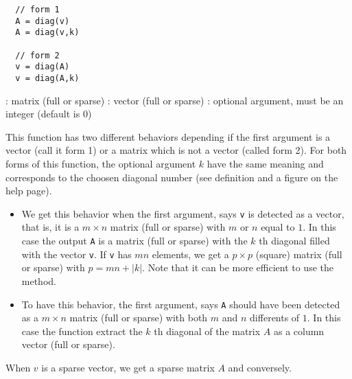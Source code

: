 \begin{mandesc}
\end{mandesc}
\begin{calling_sequence}
\begin{verbatim}
  // form 1
  A = diag(v)
  A = diag(v,k)

  // form 2
  v = diag(A)
  v = diag(A,k)
\end{verbatim}
\end{calling_sequence}
\begin{parameters}
  \begin{varlist}
    : matrix (full or sparse)
    : vector (full or sparse)
    : optional argument, must be an integer (default is $0$)
  \end{varlist}
\end{parameters}

\begin{mandescription}

  This function has two different behaviors depending if the first argument is a vector
  (call it form 1) or a matrix which is not a vector (called form 2).
  For both forms of this function, the optional argument $k$ have the same meaning and
 corresponds to the choosen diagonal number (see definition and a figure on the 
  help page).

\begin{itemize}
\item {}
   We get this behavior when the first argument, says \verb+v+ is detected as a vector, that is,
 it is a $m \times n$ matrix (full or sparse) with $m$ or $n$ equal to $1$. In this case the
 output  \verb+A+ is a matrix (full or sparse) with the $k$ th diagonal filled with the vector
 \verb+v+. If  \verb+v+ has $mn$ elements, we get a $p \times p$ (square) matrix (full or sparse)
 with $p=mn + | k |$. Note that it can be more efficient to use the 
 method.
   
\item {}
  To have this behavior, the first argument, says \verb+A+ should have been detected as 
a  $m \times n$ matrix (full or sparse) with both $m$ and $n$ differents of $1$. In this 
case the function extract the $k$ th diagonal of the matrix $A$ as a column vector (full or sparse).
\end{itemize}

 When $v$ is a sparse vector, we get a sparse matrix $A$ and conversely.


\end{mandescription}

